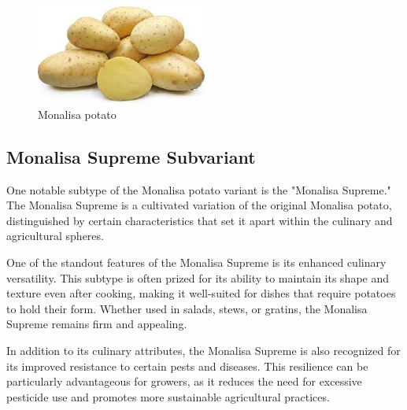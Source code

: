 \documentclass[../../../../main.tex]{subfiles}
\begin{document}
\begin{figure}[!htbp]
    \centering
    \includegraphics[width=0.5\textwidth]{Parts/PartExample/Chapters/potato_folder/figures/potato_monalisa.jpeg}
    \caption{Monalisa potato}
    \label{fig:potato_monalisa}
\end{figure}


\subsection{Monalisa Supreme Subvariant}
One notable subtype of the Monalisa potato variant is the "Monalisa Supreme." The Monalisa Supreme is a cultivated variation of the original Monalisa potato, distinguished by certain characteristics that set it apart within the culinary and agricultural spheres.

One of the standout features of the Monalisa Supreme is its enhanced culinary versatility. This subtype is often prized for its ability to maintain its shape and texture even after cooking, making it well-suited for dishes that require potatoes to hold their form. Whether used in salads, stews, or gratins, the Monalisa Supreme remains firm and appealing.

In addition to its culinary attributes, the Monalisa Supreme is also recognized for its improved resistance to certain pests and diseases. This resilience can be particularly advantageous for growers, as it reduces the need for excessive pesticide use and promotes more sustainable agricultural practices.
\end{document}
